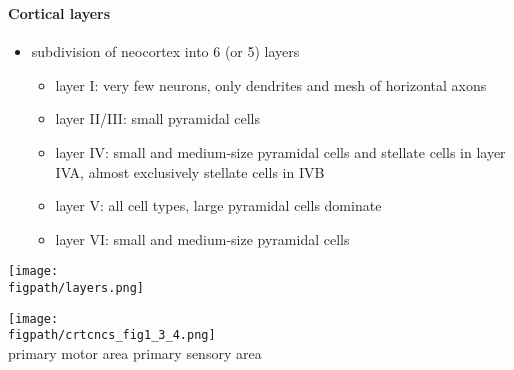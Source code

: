 \documentclass[8pt,t,usepdftitle=false]{beamer}
\def\figpath{\src/figures}
\begin{document}
\begin{frame}[plain]
  \frametitle{\ttl}
  \framesubtitle{Cortical layers}
  \vspace*{-1ex}
  \begin{itemize}
  \item subdivision of neocortex into 6 (or 5) layers
    \begin{itemize}
    \item \alert{layer I}: 
      very few neurons, only dendrites and mesh of horizontal axons
    \item \alert{layer II/III}: 
      small pyramidal cells
    \item \alert{layer IV}: 
      small and medium-size pyramidal cells and stellate cells 
      in layer IVA, 
      almost exclusively stellate cells in IVB
    \item \alert{layer V}: 
      all cell types, large pyramidal cells dominate
    \item \alert{layer VI}: 
      small and medium-size pyramidal cells
    \end{itemize}
  \end{itemize}
  \vspace*{1ex}
  \parbox{\linewidth}{
    \parbox{0.38\linewidth}{
      \texttt{[image: \\figpath/layers.png]}\\
    }%
    \hfill    
    \parbox{0.55\linewidth}{
      \vspace*{-5ex}
      \texttt{[image: \\figpath/crtcncs\_fig1\_3\_4.png]}\\
      {\small primary motor area}%
      \hfill
      {\small primary sensory area}\\
    }
  }        
\end{frame}
\end{document}
